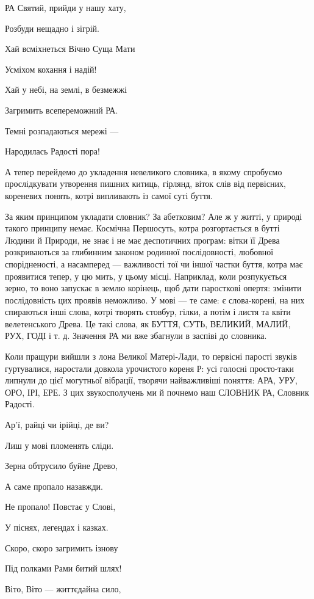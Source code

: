 РА Святий, прийди у нашу хату,

Розбуди нещадно і зігрій.

Хай всміхнеться Вічно Суща Мати

Усміхом кохання і надій!

Хай у небі, на землі, в безмежжі

Загримить всепереможний РА.

Темні розпадаються мережі —

Народилась Радості пора!

А тепер перейдемо до укладення невеликого словника, в якому спробуємо
прослідкувати утворення пишних китиць, гірлянд, віток слів від первісних,
кореневих понять, котрі випливають із самої суті буття.

За яким принципом укладати словник? За абетковим? Але ж у житті, у природі
такого принципу немає. Космічна Першосуть, котра розгортається в бутті Людини й
Природи, не знає і не має деспотичних програм: вітки її Древа розкриваються за
глибинним законом родинної послідовності, любовної спорідненості, а насамперед
— важливості тої чи іншої частки буття, котра має проявитися тепер, у цю мить,
у цьому місці. Наприклад, коли розпукується зерно, то воно запускає в землю
корінець, щоб дати паросткові опертя: змінити послідовність цих проявів
неможливо. У мові — те саме: є слова-корені, на них спираються інші слова,
котрі творять стовбур, гілки, а потім і листя та квіти велетенського Древа. Це
такі слова, як БУТТЯ, СУТЬ, ВЕЛИКИЙ, МАЛИЙ, РУХ, ГОДІ і т. д. Значення РА ми
вже збагнули в заспіві до словника.

Коли пращури вийшли з лона Великої Матері-Лади, то первісні парості звуків
гуртувалися, наростали довкола урочистого кореня Р: усі голосні просто-таки
липнули до цієї могутньої вібрації, творячи найважливіші поняття: АРА, УРУ,
ОРО, ІРІ, ЕРЕ. З цих звукосполучень ми й почнемо наш СЛОВНИК РА, Словник
Радості.

Ар’ї, райці чи ірійці, де ви?

Лиш у мові пломенять сліди.

Зерна обтрусило буйне Древо,

А саме пропало назавжди.

Не пропало! Повстає у Слові,

У піснях, легендах і казках.

Скоро, скоро загримить ізнову

Під полками Рами битий шлях!

Віто, Віто — життєдайна сило,

